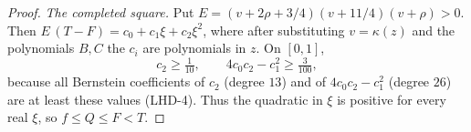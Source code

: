 \begin{proof}
\emph{The completed square.}
Put $E=(v+2\rho+3/4)(v+11/4)(v+\rho)>0$. Then $E\,(T-F)=c_0+c_1\xi+c_2\xi^2$, where after
substituting $v=\kappa(z)$ and the polynomials $B,C$ the $c_i$ are polynomials in $z$.
On $[0,1]$,
\[
 c_2\ge\tfrac1{10},\qquad 4c_0c_2-c_1^2\ge\tfrac3{100},
\]
because all Bernstein coefficients of $c_2$ (degree $13$) and of $4c_0c_2-c_1^2$ (degree $26$) are at least
these values (LHD-4). Thus the quadratic in $\xi$ is positive for every real $\xi$, so $f\le Q\le F<T$.
\end{proof}
